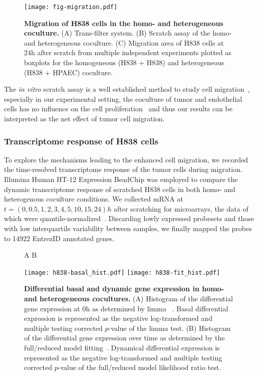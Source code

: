 \begin{figure}[!ht]
\begin{center}
\texttt{[image: fig-migration.pdf]}
\end{center}
\caption[H838 migration in homo- and heterogeneous coculture]{
{\bf Migration of H838 cells in the homo- and heterogeneous coculture.} 
(A) Trans-filter system. (B) Scratch assay of the homo- and heterogeneous coculture.
(C) Migration area of H838 cells at 24h after scratch from multiple independent 
experiments 
plotted as 
boxplots for the homogeneous (H838 + H838) and heterogeneous (H838 + HPAEC) 
coculture.
}
\label{fig:migration}
\end{figure}

The \emph{in vitro} scratch assay is a well established method
to study cell migration~\citep{Busch2008,Liang2007}, especially
in our experimental setting, the coculture of tumor and 
endothelial cells has no influence on the cell proliferation~%
\citep{Dauscher2012} and thus our results can be interpreted
as the net effect of tumor cell migration.

\subsubsection{Transcriptome response of H838 cells}

To explore the mechanisms leading to the enhanced cell migration, we recorded the time-resolved transcriptome response of the tumor cells during migration.
Illumina Human HT-12 Expression BeadChip was employed to compare the dynamic transcriptome response of scratched H838 cells in both homo- and heterogenous coculture conditions.
We collected mRNA at $t=(0,0.5,1,2,3,4,5,10,15,24)h$ after scratching for microarrays,
the data of which were quantile-normalized~\citep{Dunning2008a}.  
Discarding lowly expressed probesets and those with low interquartile 
variability between samples, we finally mapped the probes to 14922 EntrezID 
annotated genes. 

\begin{figure}[!ht]
\hskip 0.5in A \hskip 2.5in B
\begin{center}
\texttt{[image: h838-basal\_hist.pdf]}
\texttt{[image: h838-fit\_hist.pdf]}
\end{center}
\caption[Differential basal and dynamic gene expression]{
{\bf Differential basal and dynamic gene expression in homo- and heterogeneous 
cocultures.} 
(A) Histogram of the differential gene expression at 0h as determined by limma~%
\citep{Smyth2004}. 
Basal differential expression is 
represented as the negative log-transformed and multiple
testing corrected $p$-value of the limma test.
(B) Histogram of the differential gene expression over time as determined by the
full/reduced model fitting~\citep{Mar2009}.
Dynamical differential expression is 
represented as the negative log-transformed and multiple
testing corrected $p$-value of the full/reduced model
likelihood ratio test.
}
\label{fig:h838_transcriptome}
\end{figure}


